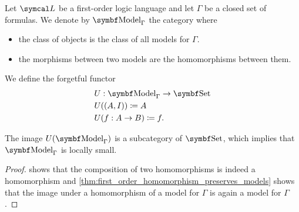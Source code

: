 \begin{definition}\label{def:first_order_model_category}
  Let \( \Cal{L} \) be a first-order logic language and let \( \Gamma \) be a closed set of formulas. We denote by \( \Cat{Model}_\Gamma \) the category where
  \begin{itemize}
    \item the class of objects is the class of all models for \( \Gamma \).
    \item the morphisms between two models are the homomorphisms between them.
  \end{itemize}

  We define the forgetful functor
  \begin{align*}
    &U: \Cat{Model}_\Gamma \to \Bold{Set} \\
    &U((A, I)) \coloneqq A \\
    &U(f: A \to B) \coloneqq f.
  \end{align*}

  The image \( U(\Cat{Model}_\Gamma) \) is a subcategory of \( \Bold{Set} \), which implies that \( \Bold{Model}_\Gamma \) is locally small.
\end{definition}
\begin{proof}
   shows that the composition of two homomorphisms is indeed a homomorphism and \cref{thm:first_order_homomorphism_preserves_models} shows that the image under a homomorphism of a model for \( \Gamma \) is again a model for \( \Gamma \).
\end{proof}

